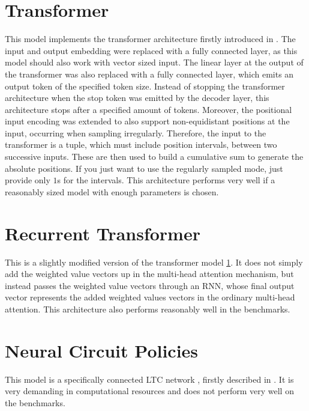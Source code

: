 \documentclass[draft,final]{vutinfth} %
\begin{document}
    \section{Transformer} \label{Transformer}
    This model implements the transformer architecture firstly introduced in \cite{Transformer}. The input and output embedding were replaced with a fully connected layer, as this model should also work with vector sized input.
    The linear layer at the output of the transformer was also replaced with a fully connected layer, which emits an output token of the specified token size.
    Instead of stopping the transformer architecture when the stop token was emitted by the decoder layer, this architecture stops after a specified amount of tokens.
    Moreover, the positional input encoding was extended to also support non-equidistant positions at the input, occurring when sampling irregularly.
    Therefore, the input to the transformer is a tuple, which must include position intervals, between two successive inputs.
    These are then used to build a cumulative sum to generate the absolute positions. If you just want to use the regularly sampled mode, just provide only $1$s for the intervals.
    This architecture performs very well if a reasonably sized model with enough parameters is chosen.


    \section{Recurrent Transformer} \label{Recurrent Transformer}
    This is a slightly modified version of the transformer model \ref{Transformer}.
    It does not simply add the weighted value vectors up in the multi-head attention mechanism, but instead passes the weighted value vectors through an RNN, whose final output vector represents the added weighted values vectors in the ordinary multi-head attention.
    This architecture also performs reasonably well in the benchmarks.


    \section{Neural Circuit Policies} \label{Neural Circuit Policies}
    This model is a specifically connected LTC network \cite{LTCNetworks}, firstly described in \cite{NCP}.
    It is very demanding in computational resources and does not perform very well on the benchmarks.
\end{document}
